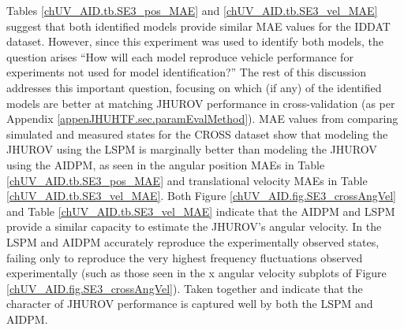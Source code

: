 Tables \ref{chUV_AID.tb.SE3_pos_MAE} and
\ref{chUV_AID.tb.SE3_vel_MAE} suggest that both identified models provide
similar \ac{MAE} values for the \ac{IDDAT} dataset.
%
However, since this experiment was used to identify both models, the
question arises ``How will each model reproduce vehicle performance
for experiments not used for model identification?''  
%
The rest of this discussion addresses this important question, 
focusing on which (if any) of the  identified models are better at matching
\ac{JHUROV} performance in cross-validation (as per Appendix \ref{appenJHUHTF.sec.paramEvalMethod}).
%
\ac{MAE} values from comparing simulated and measured states for the
\ac{CROSS} dataset show that modeling the \ac{JHUROV} using the \acf{LSPM}
is marginally better than modeling the \ac{JHUROV} using the \acf{AIDPM},
as seen in the angular position \acp{MAE} in Table
\ref{chUV_AID.tb.SE3_pos_MAE} and translational velocity \acp{MAE} in
Table \ref{chUV_AID.tb.SE3_vel_MAE}.
%
Both Figure \ref{chUV_AID.fig.SE3_crossAngVel} and Table
\ref{chUV_AID.tb.SE3_vel_MAE} indicate that the \ac{AIDPM} and
\ac{LSPM} provide a similar capacity to estimate the \ac{JHUROV}'s
angular velocity.
%
In
the \ac{LSPM} and \ac{AIDPM} accurately reproduce the experimentally
observed states, failing only to reproduce the very highest frequency
fluctuations observed experimentally (such as those seen in the x
angular velocity subplots of Figure
\ref{chUV_AID.fig.SE3_crossAngVel}).
%
Taken together
and  indicate
that the character of \ac{JHUROV} performance is captured well by both
the \ac{LSPM} and \ac{AIDPM}.





